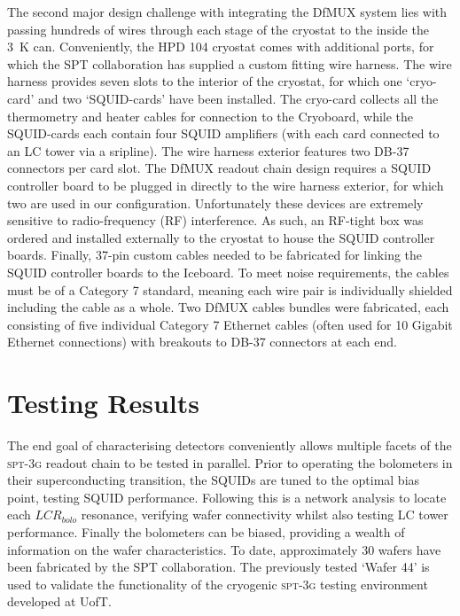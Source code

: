 \documentclass[iop]{emulateapj}
\begin{document}
The second major design challenge with integrating the DfMUX system lies with passing hundreds of wires through each stage of the cryostat to the inside the 3~K can.  Conveniently, the HPD 104 cryostat comes with additional ports, for which the SPT collaboration has supplied a custom fitting wire harness.  The wire harness provides seven slots to the interior of the cryostat, for which one `cryo-card' and two `SQUID-cards' have been installed.  The cryo-card collects all the thermometry and heater cables for connection to the Cryoboard, while the SQUID-cards each contain four SQUID amplifiers (with each card connected to an LC tower via a sripline).  The wire harness exterior features two DB-37 connectors per card slot.  The DfMUX readout chain design requires a SQUID controller board to be plugged in directly to the wire harness exterior, for which two are used in our configuration.  Unfortunately these devices are extremely sensitive to radio-frequency (RF) interference.  As such, an RF-tight box was ordered and installed externally to the cryostat to house the SQUID controller boards.  Finally, 37-pin custom cables needed to be fabricated for linking the SQUID controller boards to the Iceboard.  To meet noise requirements, the cables must be of a Category 7 standard, meaning each wire pair is individually shielded including the cable as a whole.  Two DfMUX cables bundles were fabricated, each consisting of five individual Category 7 Ethernet cables (often used for 10 Gigabit Ethernet connections) with breakouts to DB-37 connectors at each end.

\section{Testing Results}
\label{results_section}

The end goal of characterising detectors conveniently allows multiple facets of the \textsc{spt-3g} readout chain to be tested in parallel.  Prior to operating the bolometers in their superconducting transition, the SQUIDs are tuned to the optimal bias point, testing SQUID performance.  Following this is a network analysis to locate each $LCR_{bolo}$ resonance, verifying wafer connectivity whilst also testing LC tower performance.  Finally the bolometers can be biased, providing a wealth of information on the wafer characteristics.  To date, approximately 30 wafers have been fabricated by the SPT collaboration.  The previously tested `Wafer 44' is used to validate the functionality of the cryogenic \textsc{spt-3g} testing environment developed at UofT.
\end{document}

